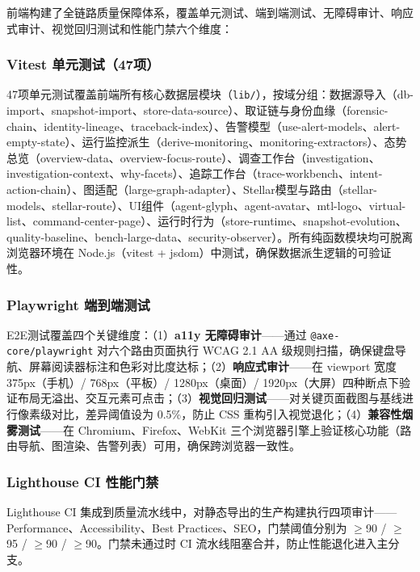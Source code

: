 \documentclass[a4paper]{ctexart}
\makeatletter
\renewcommand{\_}{%
  \ifmmode
    \nfss@text{\textunderscore}%
  \else
    \textunderscore\discretionary{}{}{}%
  \fi}
\makeatother
\begin{document}
前端构建了全链路质量保障体系，覆盖单元测试、端到端测试、无障碍审计、响应式审计、视觉回归测试和性能门禁六个维度：

\subsubsection{Vitest 单元测试（47项）}

47项单元测试覆盖前端所有核心数据层模块（\texttt{lib/}），按域分组：数据源导入（db-import、snapshot-import、store-data-source）、取证链与身份血缘（forensic-chain、identity-lineage、traceback-index）、告警模型（use-alert-models、alert-empty-state）、运行监控派生（derive-monitoring、monitoring-extractors）、态势总览（overview-data、overview-focus-route）、调查工作台（investigation、investigation-context、why-facets）、追踪工作台（trace-workbench、intent-action-chain）、图适配（large-graph-adapter）、Stellar模型与路由（stellar-models、stellar-route）、UI组件（agent-glyph、agent-avatar、mtl-logo、virtual-list、command-center-page）、运行时行为（store-runtime、snapshot-evolution、quality-baseline、bench-large-data、security-observer）。所有纯函数模块均可脱离浏览器环境在 Node.js（vitest + jsdom）中测试，确保数据派生逻辑的可验证性。

\subsubsection{Playwright 端到端测试}

E2E测试覆盖四个关键维度：（1）\textbf{a11y 无障碍审计}——通过 \texttt{@axe-core/playwright} 对六个路由页面执行 WCAG 2.1 AA 级规则扫描，确保键盘导航、屏幕阅读器标注和色彩对比度达标；（2）\textbf{响应式审计}——在 viewport 宽度 375px（手机）/ 768px（平板）/ 1280px（桌面）/ 1920px（大屏）四种断点下验证布局无溢出、交互元素可点击；（3）\textbf{视觉回归测试}——对关键页面截图与基线进行像素级对比，差异阈值设为 0.5\%，防止 CSS 重构引入视觉退化；（4）\textbf{兼容性烟雾测试}——在 Chromium、Firefox、WebKit 三个浏览器引擎上验证核心功能（路由导航、图渲染、告警列表）可用，确保跨浏览器一致性。

\subsubsection{Lighthouse CI 性能门禁}

Lighthouse CI 集成到质量流水线中，对静态导出的生产构建执行四项审计——Performance、Accessibility、Best Practices、SEO，门禁阈值分别为 $\geq$90 / $\geq$95 / $\geq$90 / $\geq$90。门禁未通过时 CI 流水线阻塞合并，防止性能退化进入主分支。
\end{document}
